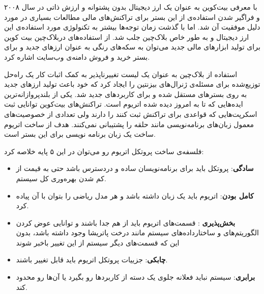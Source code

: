 \par
با معرفی بیت‌کوین 
به عنوان یک ارز دیجیتال بدون پشتوانه و ارزش ذاتی در سال ۲۰۰۸ و فراگیر شدن استفاده‌ی از این بستر برای تراکنش‌های مالی مطالعات بسیاری در مورد دلیل موفقیت آن شد. اما با گذشت زمان توجه‌ها بیشتر به تکنولوژی مورد استفاده‌ی این ارز دیجیتال و به طور خاص بلاک‌چین
 جلب شد.
از استفاده‌های دربلاک‌چین بیت کوین برای تولید ابزارهای مالی جدید می‌توان به سکه‌های رنگی به عنوان ارزهای جدید و
  برای بستر خرید و فروش دامنه‌ی وب‌سایت اشاره کرد. 
\par
استفاده از بلاک‌چین به عنوان یک لیست تغییرناپذیر به کمک اثبات کار یک راه‌حل توزیع‌شده برای مسئله‌ی ژنرال‌های بیزنتین 
را ایجاد کرد که خود باعث تولید ارزهای جدید به روی بسترهای مستقل شده و برای کاربردهای جدید شد. یکی از بلندپروازانه‌ترین ایده‌هایی که تا به امروز دیده شده اتریوم است. تراکنش‌های بیت‌کوین توانایی ثبت اسکرپت‌هایی که قواعدی برای تراکنش ثبت کنند را دارند ولی تعدادی از خصوصیت‌های معمول زبان‌های برنامه‌نویسی
 مانند حلقه را پشتیبانی نمی‌کنند. هدف از ساخت اتریوم ساخت یک زبان برنامه نویسی
 برای این بستر است. 
\par
فلسفه‌ی ساخت پروتکل اتریوم رو می‌توان در این ۵ پایه خلاصه کرد: 
\begin{itemize}
	\item \textbf{سادگی}:
 پروتکل باید برای برنامه‌نویسان ساده و دردسترس باشد حتی به قیمت از کم شدن بهره‌وری کل سیستم.
\item  \textbf{کامل‌ بودن}:
اتریوم باید یک زبان
  داشته باشد و هر مدل ریاضی را بتوان با آن پیاده کرد. 
\item \textbf{بخش‌پذیری} :
قسمت‌های اتریوم باید از هم جدا باشند و توانایی عوض کردن الگوریتم‌های و ساختارداده‌های سیستم مانند درخت پاتریشا وجود داشته باشد، بدون این که قسمت‌های دیگر سیستم از این تغییر باخبر شوند
\item \textbf{چابکی}:
 جزییات پروتکل اتریوم باید قابل تغییر باشند. 
\item \textbf{برابری}:
سیستم نباید فعلانه جلوی یک دسته از کاربردها رو بگیرد یا آن‌ها رو محدود کند.
\end{itemize}
\par
